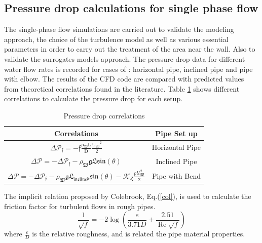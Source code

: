 \documentclass[review,3p,times,12pt]{elsarticle}
\begin{document}
\subsection{Pressure drop calculations for single phase flow}\label{single}
The single-phase flow simulations are carried out to validate the modeling approach, the choice of the turbulence model as well as various essential parameters in order to carry out the treatment of the area near the wall. Also to validate the surrogates models approach. The pressure drop data for different water flow rates is recorded for cases of : horizontal pipe, inclined pipe and pipe with elbow. The results of the CFD code are compared with predicted values from theoretical correlations found in the literature. Table \ref{tab:PD} shows different correlations to calculate the pressure drop for each setup.
\begin{table}[H]
\begin{center}
\caption{Pressure drop correlations}\label{tab:PD}
\begin{tabular}{cc}
\hline Correlations & Pipe Set up  \\
\hline
$ \displaystyle 
\Delta \mathcal{P_\mathfrak{f}=\mathfrak{-f}\frac{\mathrm{\rho\mathfrak{_{W}}} \mathrm{L}}{\mathrm{D}} \frac{\mathrm{U\mathfrak{_{W}}}^\mathrm{{2}}}{\mathrm{2}}}
$ & Horizontal Pipe \\
$ \displaystyle 
\Delta \mathcal{P}=-\Delta \mathcal{P_\mathfrak{f}-\rho_\mathfrak{{W}} \mathfrak{g} \mathfrak{ L} \mathfrak{sin(\theta)}}
$ & Inclined Pipe \\
$ \displaystyle 
\Delta \mathcal{P} =-\Delta \mathcal{ P_\mathfrak{f}-\rho_\mathfrak{{W}} \mathfrak{g} \mathfrak{L}_\mathfrak{{inclined}} \mathfrak{sin(\theta)}- K_\mathfrak{{L}} \frac{\mathrm{\rho} U_\mathfrak{{W}}^\mathrm{{2}}}{\mathrm{2}}}
$ & Pipe with Bend   \\
\hline
\end{tabular}
\end{center}
\end{table}

The implicit relation proposed by Colebrook, Eq.(\ref{col}), is used to calculate the friction factor for turbulent flows in rough pipes.
\begin{equation}
\frac{1}{\sqrt{f}}=-2 \log \left(\frac{e}{3.71 D}+\frac{2.51}{\operatorname{Re} \sqrt{f}}\right)
\label{col}
\end{equation}
where $\frac{e}{D}$ is the relative roughness, and is related the pipe material properties.
\end{document}
